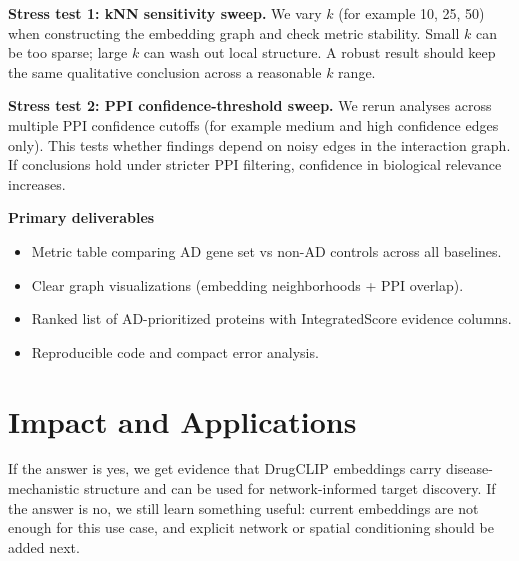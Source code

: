 \documentclass{article}
\begin{document}
\textbf{Stress test 1: kNN sensitivity sweep.}
We vary $k$ (for example 10, 25, 50) when constructing the embedding graph and check metric stability. Small $k$ can be too sparse; large $k$ can wash out local structure. A robust result should keep the same qualitative conclusion across a reasonable $k$ range.

\textbf{Stress test 2: PPI confidence-threshold sweep.}
We rerun analyses across multiple PPI confidence cutoffs (for example medium and high confidence edges only). This tests whether findings depend on noisy edges in the interaction graph. If conclusions hold under stricter PPI filtering, confidence in biological relevance increases.

\textbf{Primary deliverables}
\begin{itemize}
    \item Metric table comparing AD gene set vs non-AD controls across all baselines.
    \item Clear graph visualizations (embedding neighborhoods + PPI overlap).
    \item Ranked list of AD-prioritized proteins with IntegratedScore evidence columns.
    \item Reproducible code and compact error analysis.
\end{itemize}

\section{Impact and Applications}
If the answer is yes, we get evidence that DrugCLIP embeddings carry disease-mechanistic structure and can be used for network-informed target discovery. If the answer is no, we still learn something useful: current embeddings are not enough for this use case, and explicit network or spatial conditioning should be added next.



\end{document}

